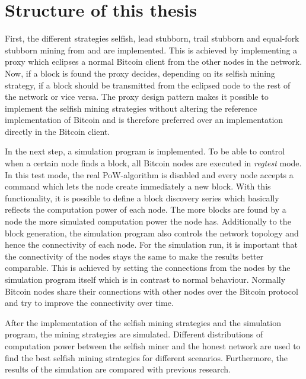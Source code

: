\section{Structure of this thesis}

First, the different strategies selfish, lead stubborn, trail stubborn and equal-fork stubborn mining from \cite{nayak2016stubborn} and \cite{eyal2014majority} are implemented.
This is achieved by implementing a proxy which eclipses a normal Bitcoin client from the other nodes in the network.
Now, if a block is found the proxy decides, depending on its selfish mining strategy, if a block should be transmitted from the eclipsed node to the rest of the network or vice versa.
The proxy design pattern makes it possible to implement the selfish mining strategies without altering the reference implementation of Bitcoin and is therefore preferred over an implementation directly in the Bitcoin client.

In the next step, a simulation program is implemented.
To be able to control when a certain node finds a block, all Bitcoin nodes are executed in \textit{regtest} mode.
In this test mode, the real PoW-algorithm is disabled and every node accepts a command which lets the node create immediately a new block.
With this functionality, it is possible to define a block discovery series which basically reflects the computation power of each node.
The more blocks are found by a node the more simulated computation power the node has.
Additionally to the block generation, the simulation program also controls the network topology and hence the connectivity of each node.
For the simulation run, it is important that the connectivity of the nodes stays the same to make the results better comparable.
This is achieved by setting the connections from the nodes by the simulation program itself which is in contrast to normal behaviour.
Normally Bitcoin nodes share their connections with other nodes over the Bitcoin protocol and try to improve the connectivity over time.

After the implementation of the selfish mining strategies and the simulation program, the mining strategies are simulated.
Different distributions of computation power between the selfish miner and the honest network are used to find the best selfish mining strategies for different scenarios.
Furthermore, the results of the simulation are compared with previous research.
